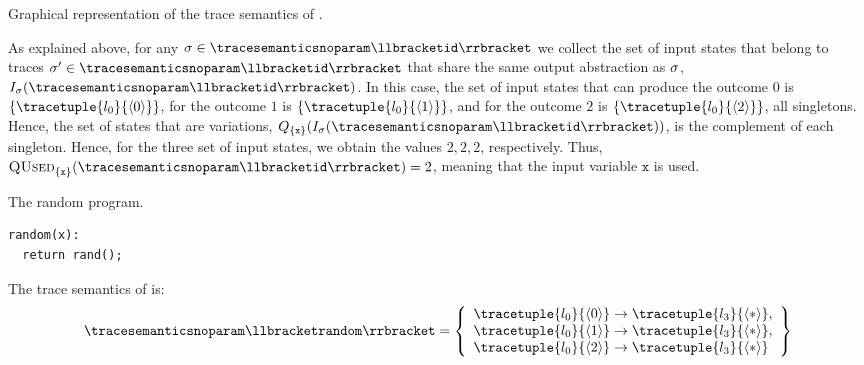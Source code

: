 \begin{example}
\begin{marginfigure}[*-1.5]
  \caption{Graphical representation of the trace semantics of .}
  \end{marginfigure}
  As explained above, for any $\deftrace\in \tracesemanticsnoparam\semanticsof{\texttt{id}}$ we collect the set of input states that belong to traces $\deftrace'\in\tracesemanticsnoparam\semanticsof{\texttt{id}}$ that share the same output abstraction as $\sigma$, \cf{} $I_{\deftrace}(\tracesemanticsnoparam\semanticsof{\texttt{id}})$.
  In this case, the set of input states that can produce the outcome $0$ is $\{\tracetuple{\locinit}{\langle 0\rangle}\}$, for the outcome $1$ is $\{\tracetuple{\locinit}{\langle 1\rangle}\}$, and for the outcome $2$ is $\{\tracetuple{\locinit}{\langle 2\rangle}\}$, all singletons.
  Hence, the set of states that are variations, \cf{} $Q_{\{\texttt{x}\}}(I_{\deftrace}(\tracesemanticsnoparam\semanticsof{\texttt{id}}))$, is the complement of each singleton.
  Hence, for the three set of input states, we obtain the values $2, 2, 2$, respectively.
  Thus, $\qusedname_{\{\texttt{x}\}}(\tracesemanticsnoparam\semanticsof{\texttt{id}})=2$, meaning that the input variable $\texttt{x}$ is used.

\begin{marginlisting}[*-3]
  \caption{The random program.}
  \vspace{15pt}
\begin{lstlisting}[style=mystyle,language=customPython]
random(x):
  return rand();
  \end{lstlisting}
\end{marginlisting}
  The trace semantics of  is:
  \begin{align*}
    \tracesemanticsnoparam\semanticsof{\texttt{random}}
    =
    \left\{
      \begin{array}{l}
        \tracetuple{\locinit}{\langle 0\rangle}\rightarrow\tracetuple{\loc{3}}{\langle \anyvalue\rangle}, \\
        \tracetuple{\locinit}{\langle 1\rangle}\rightarrow\tracetuple{\loc{3}}{\langle \anyvalue\rangle}, \\
        \tracetuple{\locinit}{\langle 2\rangle}\rightarrow\tracetuple{\loc{3}}{\langle \anyvalue\rangle}
      \end{array}
    \right\}
  \end{align*}


\end{example}
